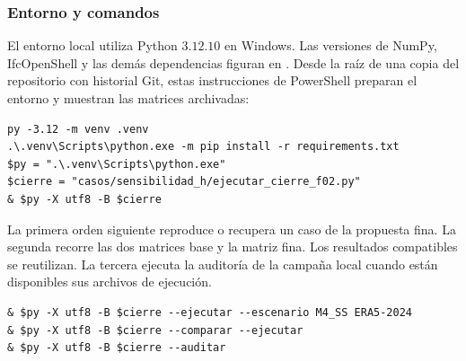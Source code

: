 \subsubsection{Entorno y comandos}

El entorno local utiliza Python $3.12.10$ en Windows. Las versiones de NumPy, IfcOpenShell y las demás dependencias figuran en . Desde la raíz de una copia del repositorio con historial Git, estas instrucciones de PowerShell preparan el entorno y muestran las matrices archivadas:
\begin{verbatim}
py -3.12 -m venv .venv
.\.venv\Scripts\python.exe -m pip install -r requirements.txt
$py = ".\.venv\Scripts\python.exe"
$cierre = "casos/sensibilidad_h/ejecutar_cierre_f02.py"
& $py -X utf8 -B $cierre
\end{verbatim}

La primera orden siguiente reproduce o recupera un caso de la propuesta fina. La segunda recorre las dos matrices base y la matriz fina. Los resultados compatibles se reutilizan. La tercera ejecuta la auditoría de la campaña local cuando están disponibles sus archivos de ejecución.
\begin{verbatim}
& $py -X utf8 -B $cierre --ejecutar --escenario M4_SS ERA5-2024
& $py -X utf8 -B $cierre --comparar --ejecutar
& $py -X utf8 -B $cierre --auditar
\end{verbatim}
